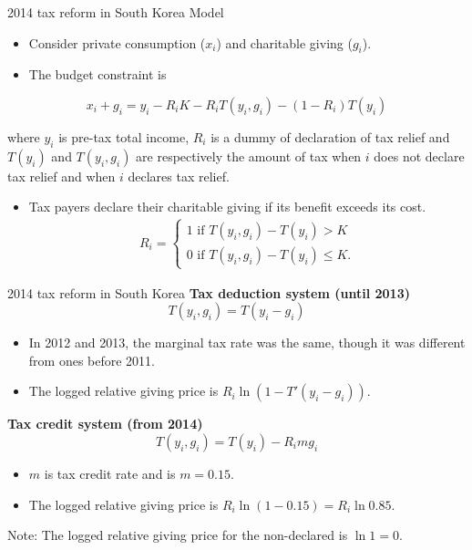 \documentclass[dvipdfmx,10pt]{beamer}
\begin{document}
	\begin{frame}{2014 tax reform in South Korea}
		\protect\hypertarget{tax-reform-in-south-korea-2}{}
		Model
		
		\begin{itemize}
			\item
			Consider private consumption (\(x_{i}\)) and charitable giving (\(g_{i}\)).
			\item
			The budget constraint is
		\end{itemize}
		
		\[x_{i} + g_{i} = y_{i} - R_iK- R_iT(y_{i}, g_{i})-(1-R_i)T(y_i)\]
		
		where \(y_{i}\) is pre-tax total income, \(R_{i}\) is a dummy of declaration of tax relief and \(T(y_i)\) and \(T(y_{i}, g_{i})\) are respectively the amount of tax when \(i\) does not declare tax relief and when \(i\) declares tax relief.
		
		\begin{itemize}
			\item Tax payers declare their charitable giving if its benefit exceeds its cost.
			\begin{align}
				R_i=\begin{cases}
					1 \text{ if }T(y_i, g_i) - T(y_i)>K\\
					0 \text{ if }T(y_i, g_i) - T(y_i)\le K.
				\end{cases}
			\end{align}
		\end{itemize}
	\end{frame}
	
	\begin{frame}{2014 tax reform in South Korea}
		\textbf{Tax deduction system (until 2013)}
		\[T(y_{i}, g_{i}) = T(y_{i} - g_{i})\]
		
		\begin{itemize}
			\item In 2012 and 2013, the marginal tax rate was the same, though it was different from ones before 2011.
			\item The logged relative giving price is \(R_{i}\ln(1 - T'(y_{i} - g_{i}))\).
		\end{itemize}
		
		\textbf{Tax credit system (from 2014)}
		\[T(y_{i}, g_{i}) = T(y_{i}) - R_{i} m g_{i}\]
		
		\begin{itemize}
			\item \(m\) is tax credit rate and is \(m = 0.15\).
			\item The logged relative giving price is \(R_{i}\ln(1 - 0.15) = R_{i}\ln 0.85\).
		\end{itemize}
		
		Note: The logged relative giving price for the non-declared is \(\ln1 =0\).
	\end{frame}
	
\end{document}
